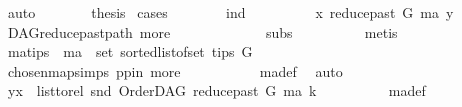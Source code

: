 \begin{isabellebody}
\ auto\isanewline
\ \ \ \ \isamarkupfalse%
\ \isamarkupfalse%
\ {\isacharquery}{\kern0pt}thesis\ \isamarkupfalse%
{\isacharparenleft}{\kern0pt}cases{\isacharparenright}{\kern0pt}\isanewline
\ \ \ \ \ \ \isamarkupfalse%
\ ind\isanewline
\ \ \ \ \ \ \isamarkupfalse%
\ \isamarkupfalse%
\ {\isachardoublequoteopen}x\ {\isasymrightarrow}\isactrlsup {\isacharplus}{\kern0pt}\isactrlbsub reduce{\isacharunderscore}{\kern0pt}past\ G\ ma\isactrlesub \ y{\isachardoublequoteclose}\ \isamarkupfalse%
\ DAG{\isachardot}{\kern0pt}reduce{\isacharunderscore}{\kern0pt}past{\isacharunderscore}{\kern0pt}path{}\ more\ \ \isanewline
\ \ \ \ \ \ \ \ \ \ {}\ subs{\isacharparenleft}{\kern0pt}{}{\isacharparenright}{\kern0pt}\isanewline
\ \ \ \ \ \ \ \ \isamarkupfalse%
\ {\isacharparenleft}{\kern0pt}metis{\isacharparenright}{\kern0pt}\ \isanewline
\ \ \ \ \ \ \isamarkupfalse%
\ \isamarkupfalse%
\ ma{\isacharunderscore}{\kern0pt}tips{\isacharcolon}{\kern0pt}\ {\isachardoublequoteopen}\ ma\ {\isasymin}\ set\ {\isacharparenleft}{\kern0pt}sorted{\isacharunderscore}{\kern0pt}list{\isacharunderscore}{\kern0pt}of{\isacharunderscore}{\kern0pt}set\ {\isacharparenleft}{\kern0pt}tips\ G{\isacharparenright}{\kern0pt}{\isacharparenright}{\kern0pt}{\isachardoublequoteclose}\ \isanewline
\ \ \ \ \ \ \ \ \isamarkupfalse%
\ chosen{\isacharunderscore}{\kern0pt}map{\isacharunderscore}{\kern0pt}simps{\isacharparenleft}{\kern0pt}{}{\isacharparenright}{\kern0pt}\ pp{\isacharunderscore}{\kern0pt}in\ more{\isacharparenleft}{\kern0pt}{}{\isacharparenright}{\kern0pt}\ \isanewline
\ \ \ \ \ \ \ \ \isamarkupfalse%
\ ma{\isacharunderscore}{\kern0pt}def\ \isamarkupfalse%
\ auto\isanewline
\ \ \ \ \ \ \isamarkupfalse%
\ \isamarkupfalse%
\ {\isachardoublequoteopen}{\isacharparenleft}{\kern0pt}y{\isacharcomma}{\kern0pt}x{\isacharparenright}{\kern0pt}\ {\isasymin}\ list{\isacharunderscore}{\kern0pt}to{\isacharunderscore}{\kern0pt}rel\ {\isacharparenleft}{\kern0pt}snd\ {\isacharparenleft}{\kern0pt}OrderDAG\ {\isacharparenleft}{\kern0pt}reduce{\isacharunderscore}{\kern0pt}past\ G\ ma{\isacharparenright}{\kern0pt}\ k{\isacharparenright}{\kern0pt}{\isacharparenright}{\kern0pt}{\isachardoublequoteclose}\isanewline
\ \ \ \ \ \ \ \ \isamarkupfalse%
\ ma{\isacharunderscore}{\kern0pt}def\isanewline

\end{isabellebody}
